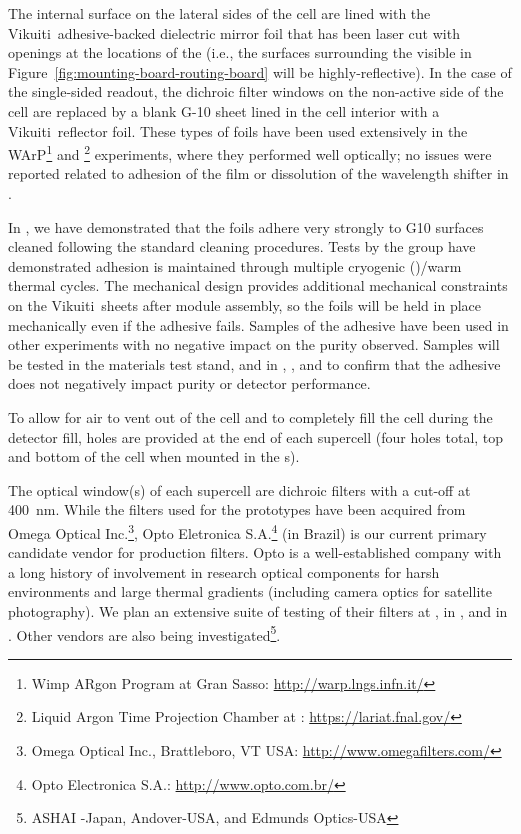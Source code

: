 The  internal surface on the lateral sides of the cell are lined with the Vikuiti\texttrademark\ adhesive-backed dielectric mirror foil
that has been laser cut with openings at the locations of the  (i.e., the  surfaces surrounding the  visible in Figure~\ref{fig:mounting-board-routing-board} will be highly-reflective).  In the case of the single-sided readout, the dichroic filter windows on the non-active side of the cell are replaced by a blank \frfour G-10 sheet lined in the cell interior with a Vikuiti\texttrademark\ reflector foil.
These types of foils have been used extensively in the WArP\footnote{Wimp ARgon Program at Gran Sasso: \url{http://warp.lngs.infn.it/}} and \footnote{Liquid Argon Time Projection Chamber at : \url{https://lariat.fnal.gov/}} experiments, where they performed well optically; no issues were reported related to adhesion of the film or dissolution of the wavelength shifter in .

In , we have demonstrated that the foils adhere very strongly to \frfour G10 surfaces cleaned following the  standard cleaning procedures.  Tests by the  group have demonstrated adhesion is maintained through multiple cryogenic ()/warm thermal cycles.  The mechanical design provides additional mechanical constraints on the Vikuiti\texttrademark\ sheets after module assembly, so the foils will be held in place mechanically even if the adhesive fails.  Samples of the adhesive have been used in other experiments with no negative impact on the  purity observed.  Samples will be tested in the  materials test stand, and in , , and  to confirm that the adhesive does not negatively impact  purity or detector performance.

To allow for air to vent out of the cell and  to completely fill the cell during the detector fill, holes are provided at the end of each supercell (four holes total, top and bottom of the cell when mounted in the s).

The optical window(s) of each supercell are dichroic filters with a cut-off at \SI{400}{nm}. While the filters used for the  prototypes have been acquired from Omega Optical Inc.\footnote{Omega Optical Inc., Brattleboro, VT USA: \url{http://www.omegafilters.com/}}, Opto Eletronica S.A.\footnote{Opto Electronica S.A.: \url{http://www.opto.com.br/}} (in Brazil) is our current primary candidate vendor for  production filters.  Opto is a well-established company with a long history of involvement in research optical components for harsh environments and large thermal gradients (including camera optics for satellite photography).  We plan an extensive suite of testing of their filters at , in , and in . Other vendors are also being investigated\footnote{ASHAI -Japan, Andover-USA, and Edmunds Optics-USA}.

